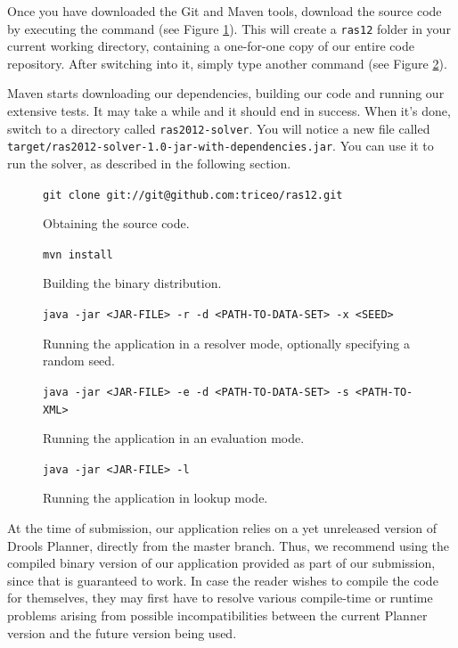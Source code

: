 \documentclass[10pt,a4paper,final]{article}
\begin{document}
Once you have downloaded the Git and Maven tools, download the source code by executing the command (see Figure \ref{figure:git}). This will create a \texttt{ras12} folder in your current working directory, containing a one-for-one copy of our entire code repository. After switching into it, simply type another command (see Figure \ref{figure:maven}).

Maven starts downloading our dependencies, building our code and running our extensive tests. It may take a while and it should end in success. When it's done, switch to a directory called \texttt{ras2012-solver}. You will notice a new file called \texttt{target/ras2012-solver-1.0-jar-with-dependencies.jar}. You can use it to run the solver, as described in the following section.

\begin{figure}
\centering
\texttt{git clone git://git@github.com:triceo/ras12.git}
\caption{Obtaining the source code.}
\label{figure:git}
\end{figure}

\begin{figure}
\centering
\texttt{mvn install}
\caption{Building the binary distribution.}
\label{figure:maven}
\end{figure}

\begin{figure}
\centering
\texttt{java -jar <JAR-FILE> -r -d <PATH-TO-DATA-SET> -x <SEED>}
\caption{Running the application in a resolver mode, optionally specifying a random seed.}
\label{figure:run-resolver}
\end{figure}

\begin{figure}
\centering
\texttt{java -jar <JAR-FILE> -e -d <PATH-TO-DATA-SET> -s <PATH-TO-XML>}
\caption{Running the application in an evaluation mode.}
\label{figure:run-evaluation}
\end{figure}

\begin{figure}
\centering
\texttt{java -jar <JAR-FILE> -l}
\caption{Running the application in lookup mode.}
\label{figure:run-lookup}
\end{figure}

At the time of submission, our application relies on a yet unreleased version of Drools Planner, directly from the master branch. Thus, we recommend using the compiled binary version of our application provided as part of our submission, since that is guaranteed to work. In case the reader wishes to compile the code for themselves, they may first have to resolve various compile-time or runtime problems arising from possible incompatibilities between the current Planner version and the future version being used.
\end{document}
